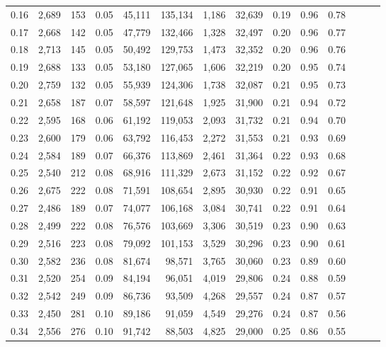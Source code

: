 \begin{tabular}{rrrrrrrrrrrrrr}
0.16 &  2,689 &    153 &  0.05 &   45,111 &  135,134 &   1,186 &  32,639 &  0.19 &  0.96 &      0.78 \\
0.17 &  2,668 &    142 &  0.05 &   47,779 &  132,466 &   1,328 &  32,497 &  0.20 &  0.96 &      0.77 \\
0.18 &  2,713 &    145 &  0.05 &   50,492 &  129,753 &   1,473 &  32,352 &  0.20 &  0.96 &      0.76 \\
0.19 &  2,688 &    133 &  0.05 &   53,180 &  127,065 &   1,606 &  32,219 &  0.20 &  0.95 &      0.74 \\
0.20 &  2,759 &    132 &  0.05 &   55,939 &  124,306 &   1,738 &  32,087 &  0.21 &  0.95 &      0.73 \\
0.21 &  2,658 &    187 &  0.07 &   58,597 &  121,648 &   1,925 &  31,900 &  0.21 &  0.94 &      0.72 \\
0.22 &  2,595 &    168 &  0.06 &   61,192 &  119,053 &   2,093 &  31,732 &  0.21 &  0.94 &      0.70 \\
0.23 &  2,600 &    179 &  0.06 &   63,792 &  116,453 &   2,272 &  31,553 &  0.21 &  0.93 &      0.69 \\
0.24 &  2,584 &    189 &  0.07 &   66,376 &  113,869 &   2,461 &  31,364 &  0.22 &  0.93 &      0.68 \\
0.25 &  2,540 &    212 &  0.08 &   68,916 &  111,329 &   2,673 &  31,152 &  0.22 &  0.92 &      0.67 \\
0.26 &  2,675 &    222 &  0.08 &   71,591 &  108,654 &   2,895 &  30,930 &  0.22 &  0.91 &      0.65 \\
0.27 &  2,486 &    189 &  0.07 &   74,077 &  106,168 &   3,084 &  30,741 &  0.22 &  0.91 &      0.64 \\
0.28 &  2,499 &    222 &  0.08 &   76,576 &  103,669 &   3,306 &  30,519 &  0.23 &  0.90 &      0.63 \\
0.29 &  2,516 &    223 &  0.08 &   79,092 &  101,153 &   3,529 &  30,296 &  0.23 &  0.90 &      0.61 \\
0.30 &  2,582 &    236 &  0.08 &   81,674 &   98,571 &   3,765 &  30,060 &  0.23 &  0.89 &      0.60 \\
0.31 &  2,520 &    254 &  0.09 &   84,194 &   96,051 &   4,019 &  29,806 &  0.24 &  0.88 &      0.59 \\
0.32 &  2,542 &    249 &  0.09 &   86,736 &   93,509 &   4,268 &  29,557 &  0.24 &  0.87 &      0.57 \\
0.33 &  2,450 &    281 &  0.10 &   89,186 &   91,059 &   4,549 &  29,276 &  0.24 &  0.87 &      0.56 \\
0.34 &  2,556 &    276 &  0.10 &   91,742 &   88,503 &   4,825 &  29,000 &  0.25 &  0.86 &      0.55 \\

\end{tabular}
